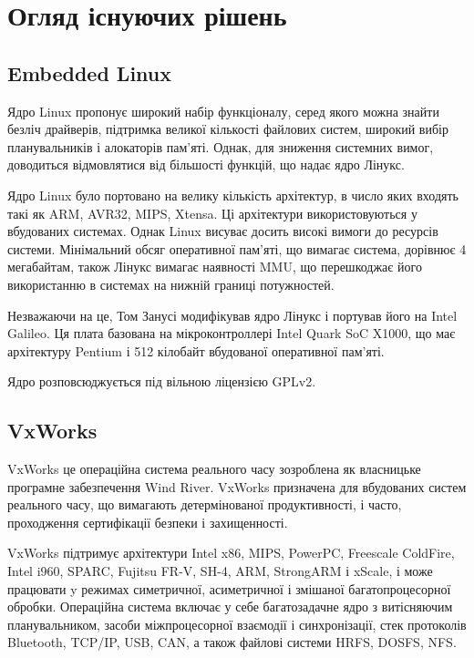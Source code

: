 \documentclass[oneside,14pt,a4paper,final]{extreport}
\begin{document}
\chapter{Огляд існуючих рішень}
\section{Embedded Linux}

Ядро Linux\cite{linux} пропонує широкий набір функціоналу, серед якого можна знайти безліч драйверів, підтримка великої кількості файлових систем, широкий вибір планувальників і алокаторів пам'яті. Однак, для зниження системних вимог, доводиться відмовлятися від більшості функцій, що надає ядро Лінукс.

Ядро Linux було портовано на велику кількість архітектур, в число яких входять такі як ARM, AVR32, MIPS, Xtensa. Ці архітектури використовуються у вбудованих системах. Однак Linux висуває досить високі вимоги до ресурсів системи. Мінімальний обсяг оперативної пам'яті, що вимагає система, дорівнює 4 мегабайтам, також Лінукс вимагає наявності \ac{MMU}, що перешкоджає його використанню в системах на нижній границі потужностей.

Незважаючи на це, Том Занусі модифікував ядро Лінукс і портував його на Intel Galileo\cite{linux-galileo}. Ця плата базована на мікроконтроллері Intel Quark SoC X1000, що має архітектуру Pentium і 512 кілобайт вбудованої оперативної пам'яті\cite{intel-galileo}.

Ядро розповсюджується під вільною ліцензією GPLv2.

\section{VxWorks}

VxWorks\cite{vxworks} це операційна система реального часу зозроблена як власницьке програмне забезпечення Wind River. VxWorks призначена для вбудованих систем реального часу, що вимагають детермінованої продуктивності, і часто, проходження сертифікації безпеки і захищенності.

VxWorks підтримує архітектури Intel x86, MIPS, PowerPC, Freescale ColdFire, Intel i960, SPARC, Fujitsu FR-V, SH-4, ARM, StrongARM і xScale, і може працювати y режимах симетричної, асиметричної і змішаної багатопроцесорної обробки. Операційна система включає у себе багатозадачне ядро з витісняючим планувальником, засоби міжпроцесорної взаємодії і синхронізації, стек протоколів Bluetooth, \acs{TCP/IP}, \acs{USB}, \acs{CAN}, а також файлові системи \ac{HRFS}, \acs{DOSFS}, \ac{NFS}.
\end{document}
